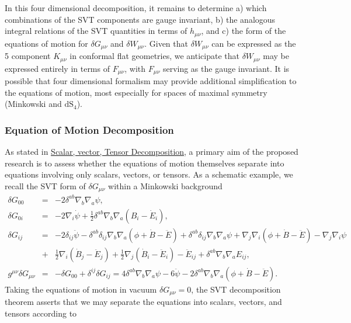 \documentclass[10pt,letterpaper]{article}
\numberwithin{equation}{section}
\begin{document}
\indent In this four dimensional decomposition, it remains to determine a) which combinations of the SVT components are gauge invariant, b) the analogous integral relations of the SVT quantities in terms of $h_{\mu\nu}$, and c) the form of the equations of motion for $\delta G_{\mu\nu}$ and $\delta W_{\mu\nu}$. Given that $\delta W_{\mu\nu}$ can be expressed as the 5 component $K_{\mu\nu}$ in conformal flat geometries, we anticipate that $\delta W_{\mu\nu}$ may be expressed entirely in terms of $F_{\mu\nu}$, with $F_{\mu\nu}$ serving as the gauge invariant. It is possible that four dimensional formalism may provide additional simplification to the equations of motion, most especially for spaces of maximal symmetry (Minkowski and $\text{dS}_4$). 
%
\subsubsection{Equation of Motion Decomposition}
\label{sec:Equation of Motion Decomposition}
As stated in \hyperref[sec:Scalar, vector, Tensor Decomposition]{Scalar, vector, Tensor Decomposition}, a primary aim of the proposed research is to assess whether the equations of motion themselves separate into equations involving only scalars, vectors, or tensors. As a schematic example, we recall the SVT form of $\delta G_{\mu\nu}$ within a Minkowski background 
\begin{eqnarray}
\delta G_{00}&=&- 2 \delta^{ab} {\nabla}_{b}{\nabla}_{a}\psi,
\nonumber\\
\delta G_{0i}&=&- 2 {\nabla}_{i}\dot{\psi}+ \tfrac{1}{2} \delta^{ab} {\nabla}_{b}{\nabla}_{a}(B_{i} -  \dot{E}_{i}),
\nonumber\\
\delta G_{ij}&=&- 2 \delta_{ij} \ddot{\psi} -  \delta^{ab} \delta_{ij} {\nabla}_{b}{\nabla}_{a}(\phi+\dot{B}  -\ddot{E})+ \delta^{ab} \delta_{ij} {\nabla}_{b}{\nabla}_{a}\psi 
+ {\nabla}_{j}{\nabla}_{i}(\phi+\dot{B} -  \ddot{E})  -  {\nabla}_{j}{\nabla}_{i}\psi
\nonumber\\
&+& \tfrac{1}{2} {\nabla}_{i}(\dot{B}_{j} - \ddot{E}_{j}) + \tfrac{1}{2} {\nabla}_{j}(\dot{B}_{i}  
- \ddot{E}_{i})- \ddot{E}_{ij} + \delta^{ab} {\nabla}_{b}{\nabla}_{a}E_{ij},
\nonumber\\
g^{\mu\nu}\delta G_{\mu\nu}&=&-\delta G_{00}+\delta^{ij}\delta G_{ij}=4 \delta^{ab} {\nabla}_{b}{\nabla}_{a}\psi -6\ddot{\psi}-2 \delta^{ab} {\nabla}_{b}{\nabla}_{a}(\phi+\dot{B}  -\ddot{E}).
\end{eqnarray}
Taking the equations of motion in vacuum $\delta G_{\mu\nu} = 0$, the SVT decomposition theorem asserts that we may separate the equations into scalars, vectors, and tensors according to
\end{document}
